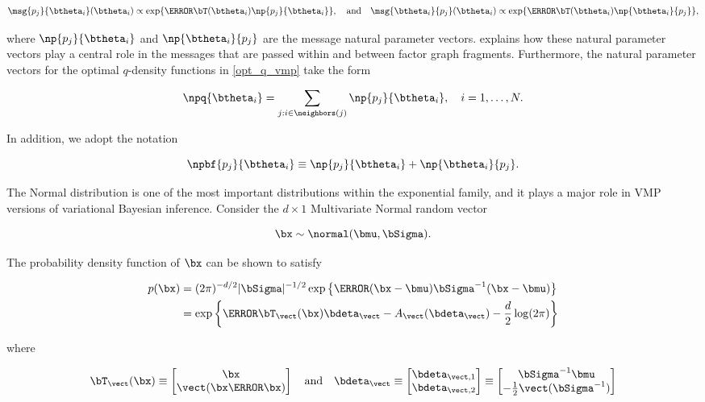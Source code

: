 \documentclass[12pt]{article}
\theoremstyle{plain}
\theoremstyle{definition}
\theoremstyle{remark}
\begin{document}
\[
	\msg{p_j}{\btheta_i} (\btheta_i)
		\propto
			\exp \{ \T{\bT (\btheta_i)} \np{p_j}{\btheta_i} \}, \quad
	\text{and} \quad
	\msg{\btheta_i}{p_j} (\btheta_i)
		\propto
			\exp \{ \T{\bT (\btheta_i)} \np{\btheta_i}{p_j} \},
\]

\noindent where $\np{p_j}{\btheta_i}$ and $\np{\btheta_i}{p_j}$ are the message natural parameter vectors.
 explains how these natural parameter vectors play a central role in the messages that are
passed within and between factor graph fragments. Furthermore, the natural parameter vectors for the
optimal $q$-density functions in \eqref{opt_q_vmp} take the form

\begin{equation}
	\npq{\btheta_i} = \sum_{j : i \in \neighbors(j)} \np{p_j}{\btheta_i}, \quad i = 1, \dots, N.
\label{etaq}
\end{equation}

\noindent In addition, we adopt the notation

\begin{equation}
	\npbf{p_j}{\btheta_i} \equiv \np{p_j}{\btheta_i} + \np{\btheta_i}{p_j}.
\label{npbf}
\end{equation}

The Normal distribution is one of the most important distributions within the exponential family, and it plays a
major role in VMP versions of variational Bayesian inference. Consider the $d \times 1$ Multivariate Normal
random vector

\[
	\bx \sim \normal (\bmu, \bSigma).
\]

\noindent The probability density function of $\bx$ can be shown to satisfy

\begin{align}
\begin{split}
	p(\bx)
		&= (2 \pi)^{-d/2} |\bSigma|^{-1/2} \exp \left\{ \T{(\bx - \bmu)} \bSigma^{-1} (\bx - \bmu) \right\} \\
		&= \exp \left\{ \T{\bT_{\vect} (\bx)} \bdeta_{\vect} - A_{\vect} (\bdeta_{\vect}) - \frac{d}{2} \log (2 \pi) \right\}
\end{split}
\label{vec_repn}
\end{align}

\noindent where

\[
	\bT_{\vect} (\bx) \equiv \begin{bmatrix}
		\bx \\
		\vect (\bx \T{\bx})
	\end{bmatrix} \quad
	\text{and} \quad
	\bdeta_{\vect} \equiv \begin{bmatrix}
		\bdeta_{\vect, 1} \\
		\bdeta_{\vect, 2}
	\end{bmatrix} \equiv \begin{bmatrix}
		\bSigma^{-1} \bmu \\
		-\frac12 \vect (\bSigma^{-1})
	\end{bmatrix}
\]
\end{document}
